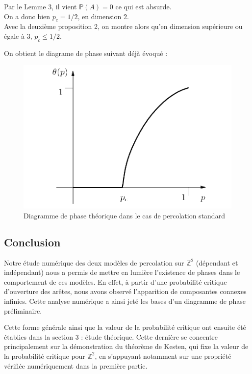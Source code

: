\documentclass[11pt,a4paper]{article}
\begin{document}
Par le Lemme 3, il vient $\mathbb{P}\left(A\right) = 0$ ce qui est absurde.
\\

On a donc bien $p_c = 1/2$, en dimension 2.
\\

Avec la deuxième proposition 2, on montre alors qu'en dimension supérieure ou égale à $3$, $p_c \le 1/2$.

On obtient le diagrame de phase suivant déjà évoqué :


\begin{figure}[H]
    \centering
    \includegraphics[width=0.4 \textwidth]{./Pictures/ph_th.png}
    \caption{Diagramme de phase théorique dans le cas de percolation standard \cite{grimmett}}
    \label{fig:phase_th}
\end{figure}


\subsection{Conclusion}

Notre étude numérique des deux modèles de percolation sur $\mathbb{Z}^2$ (dépendant et indépendant) nous a permis de mettre en lumière l'existence de phases dans le comportement de ces modèles. En effet, à partir d'une probabilité critique d'ouverture des arêtes, nous avons observé l'apparition de composantes connexes infinies. Cette analyse numérique a ainsi jeté les bases d'un diagramme de phase préliminaire.

Cette forme générale ainsi que la valeur de la probabilité critique ont ensuite été établies dans la section 3 : étude théorique. Cette dernière se concentre principalement sur la démonstration du théorème de Kesten, qui fixe la valeur de la probabilité critique pour $\mathbb{Z}^2$, en s'appuyant notamment sur une propriété vérifiée numériquement dans la première partie.


\printbibliography[heading=bibintoc, title={Références}]
\end{document}
